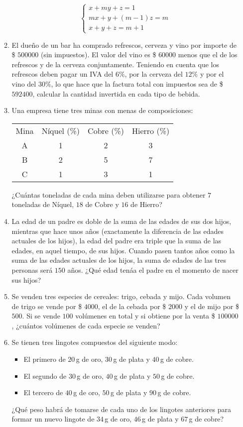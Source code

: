 \documentclass[a4paper,12pt]{article}
\begin{document}
\begin{enumerate}
\begin{enumerate}
      \[
        \begin{cases}
          x + my + z = 1\\
          mx + y + (m-1) z = m\\
          x + y + z = m+1
        \end{cases}
      \]
    \item El dueño de un bar ha comprado refrescos, cerveza y vino por importe de \$ $500000$ (sin impuestos). El valor del vino es \$ $60000$ menos que el de los refrescos y de la cerveza conjuntamente. Teniendo en cuenta que los refrescos deben pagar un IVA del $6\%$, por la cerveza del $12\%$ y por el vino del $30\%$, lo que hace que la factura total con impuestos sea de \$ $592400$, calcular la cantidad invertida en cada tipo de bebida.
    \item Una empresa tiene tres minas con menas de composiciones:\\
      \begin{center}
        \begin{tabular}{cccc}
          Mina & Níquel (\%) & Cobre (\%) & Hierro (\%) \\
          A & 1 & 2 & 3 \\
          B & 2 & 5 & 7 \\
          C & 1 & 3 & 1 \\
        \end{tabular}
      \end{center}
      ¿Cuántas toneladas de cada mina deben utilizarse para obtener $7$ toneladas de Níquel, $18$ de Cobre y $16$ de Hierro?
    \item La edad de un padre es doble de la suma de las edades de sus dos hijos, mientras que hace unos años (exactamente la diferencia de las edades actuales de los hijos), la edad del padre era triple que la suma de las edades, en aquel tiempo, de sus hijos. Cuando pasen tantos años como la suma de las edades actuales de los hijos, la suma de edades de las tres personas será $150$ años. ¿Qué edad tenáa el padre en el momento de nacer sus hijos?
    \item Se venden tres especies de cereales: trigo, cebada y mijo. Cada volumen de trigo se vende por \$ $4000$, el de la cebada por \$ $2000$ y el de mijo por \$ $500$. Si se vende $100$ volúmenes en total y si obtiene por la venta \$ $100000$, ¿cuántos volúmenes de cada especie se venden?
    \item Se tienen tres lingotes compuestos del siguiente modo:
      \begin{itemize}
        \item El primero de $20$\,g de oro, $30$\,g de plata y $40$\,g de cobre.
        \item El segundo de $30$\,g de oro, $40$\,g de plata y $50$\,g de cobre.
        \item El tercero de $40$\,g de oro, $50$\,g de plata y $90$\,g de cobre.
      \end{itemize}
      ¿Qué peso habrá de tomarse de cada uno de los lingotes anteriores para formar un nuevo lingote de $34$\,g de oro, $46$\,g de plata y $67$\,g de cobre?
    \end{enumerate}
  \end{enumerate}
\end{document}
